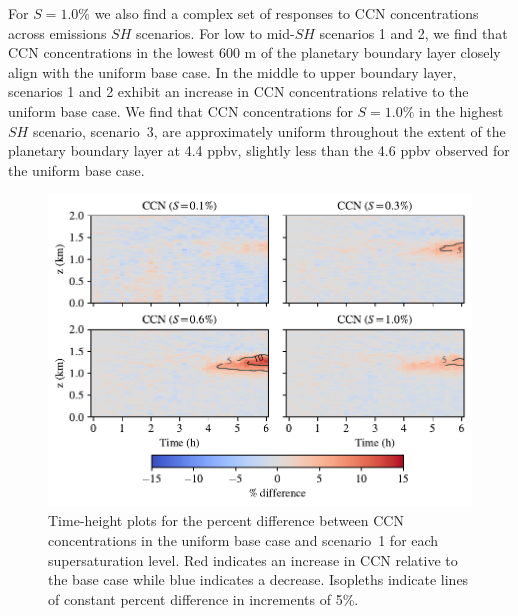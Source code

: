 For $S=1.0\%$ we also find a complex set of responses to CCN concentrations across emissions $SH$ scenarios. For low to mid-$SH$ scenarios 1 and 2, we find that CCN concentrations in the lowest $600$ m of the planetary boundary layer closely align with the uniform base case. In the middle to upper boundary layer, scenarios 1 and 2 exhibit an increase in CCN concentrations relative to the uniform base case. We find that CCN concentrations for $S=1.0\%$ in the highest $SH$ scenario, scenario~3, are approximately uniform throughout the extent of the planetary boundary layer at 4.4 ppbv, slightly less than the 4.6 ppbv observed for the uniform base case. 

\begin{figure}[!t]
  \centering
    \includegraphics[width=\textwidth]{figures/chapter5/height-time-ccn-pdiff-fx1fy0.pdf}
    \caption{Time-height plots for the percent difference between CCN concentrations in the uniform base case and scenario~1 for each supersaturation level. Red indicates an increase in CCN relative to the base case while blue indicates a decrease. Isopleths indicate lines of constant percent difference in increments of 5\%.}
    \label{fig:ht-ccn-pdiff-s1}
\end{figure}

